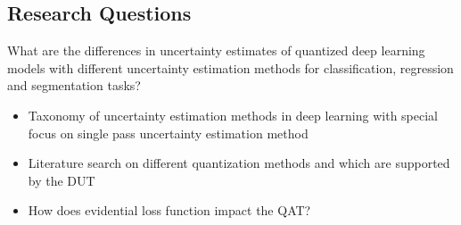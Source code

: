 \documentclass[rnd]{mas_proposal}
\begin{document}
\subsection{Research Questions}
What are the differences in uncertainty estimates of quantized deep learning models with different uncertainty estimation methods for classification, regression and segmentation tasks?
\begin{itemize}
    \item Taxonomy of uncertainty estimation methods in deep learning with special focus on single pass uncertainty estimation method
    \item Literature search on different quantization methods and which are supported by the DUT
    \item How does evidential loss function impact the QAT?
\end{itemize}
\end{document}
